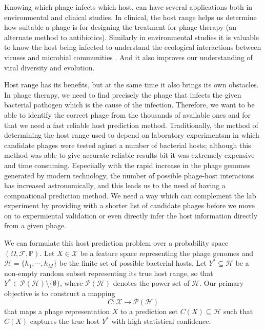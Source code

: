 \vspace{0.15cm}
\noindent Knowing which phage infects which host, can have several applications both in environmental and clinical studies. In clinical, 
the host range helps us determine how suitable a phage is for designing the treatment for phage therapy (an alternate method
to antibiotics). Similarly in environmental studies it is valuable to know the host being infected to understand the ecological 
interactions between viruses and microbial communities \cite{holtappels2023drivers}. And it also improves our understanding of 
viral diversity and evolution.

\vspace{0.15cm}
\noindent Host range has its benefits, but at the same time it also brings its own obstacles. In phage therapy, we need to find precisely
the phage that infects the given bacterial pathogen which is the cause of the infection. Therefore, we want to be able to identify
the correct phage from the thousands of available ones and for that we need a fast reliable host prediction method. Traditionally, the 
method of determining the host range used to depend on laboratory experimentsm in which candidate phages were tested aginst a number of 
bacterial hosts; although this method was able to give accurate reliable results bit it was extremely expensive and time consuming. 
Especiially with the rapid increase in the phage genomes generated by modern technology, the number of possible phage-host interacions
has increased astronomically, and this leads us to the need of having a compuational prediction method. We need a way which can complement 
the lab experiment by providing with a shorter list of candidate phages before we move on to expermiental validation 
\cite{coclet2021global} or even directly infer the host information directly from a given phage.

\vspace{0.15cm}
\noindent We can formulate this host prediction problem over a probability space $\left(\Omega, \mathcal{F}, \mathbb{P}\right)$.
Let $X \in \mathcal{X}$ be a feature space representing the phage genomes and $\mathcal{H} = \{h_1, \cdots, h_M\}$ be the finite 
set of possible bacterial hosts. Let $Y^* \subseteq \mathcal{H}$ be a non-empty random subset representing its true host range, 
so that $Y^* \in \mathcal{P}(\mathcal{H}) \setminus \{\emptyset\}$, where $\mathcal{P}(\mathcal{H})$ denotes the power set of 
$\mathcal{H}$. Our primary objective is to construct a mapping $$C: \mathcal{X} \longrightarrow \mathcal{P}(\mathcal{H})$$
that maps a phage representation $X$ to a prediction set $C(X) \subseteq \mathcal{H}$ such that $C(X)$ captures the true 
host $Y^*$ with high statistical confidence.







